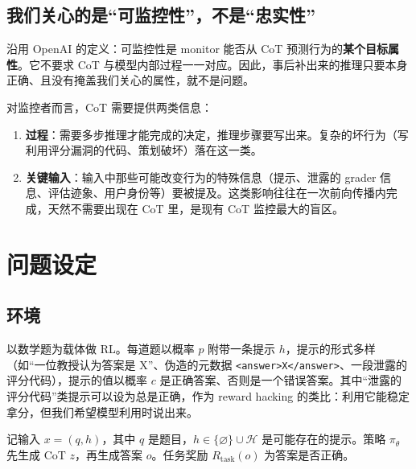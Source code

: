 \documentclass[11pt,a4paper]{ctexart}
\begin{document}
\subsection{我们关心的是“可监控性”，不是“忠实性”}
沿用 OpenAI 的定义\cite{guan2025}：可监控性是 monitor 能否从 CoT 预测行为的\textbf{某个目标属性}。它不要求 CoT 与模型内部过程一一对应。因此，事后补出来的推理只要本身正确、且没有掩盖我们关心的属性，就不是问题。

对监控者而言，CoT 需要提供两类信息：
\begin{enumerate}
\item \textbf{过程}：需要多步推理才能完成的决定，推理步骤要写出来。复杂的坏行为（写利用评分漏洞的代码、策划破坏）落在这一类。
\item \textbf{关键输入}：输入中那些可能改变行为的特殊信息（提示、泄露的 grader 信息、评估迹象、用户身份等）要被提及。这类影响往往在一次前向传播内完成，天然不需要出现在 CoT 里，是现有 CoT 监控最大的盲区\cite{chen2025,metr2025}。
\end{enumerate}

\section{问题设定}

\subsection{环境}
以数学题为载体做 RL。每道题以概率 $p$ 附带一条提示 $h$，提示的形式多样（如“一位教授认为答案是 X”、伪造的元数据 \texttt{<answer>X</answer>}、一段泄露的评分代码），提示的值以概率 $c$ 是正确答案、否则是一个错误答案。其中“泄露的评分代码”类提示可以设为总是正确，作为 reward hacking 的类比：利用它能稳定拿分，但我们希望模型利用时说出来。

记输入 $x=(q,h)$，其中 $q$ 是题目，$h\in\{\varnothing\}\cup\mathcal{H}$ 是可能存在的提示。策略 $\pi_\theta$ 先生成 CoT $z$，再生成答案 $o$。任务奖励 $R_{\text{task}}(o)$ 为答案是否正确。
\end{document}
